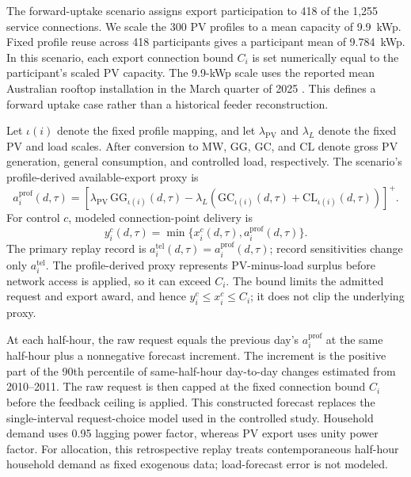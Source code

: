 \documentclass[twoside,twocolumn,9pt]{article}
\begin{document}
{The forward-uptake scenario assigns export participation to 418 of the 1,255
service connections. We scale the 300 PV profiles to a mean capacity of
9.9~kWp. Fixed profile reuse across 418 participants gives a participant mean
of 9.784~kWp. In this scenario, each export connection bound $C_i$ is set
numerically equal to the participant's scaled PV capacity.
The 9.9-kWp scale uses the reported mean Australian rooftop installation in the
March quarter of 2025 \cite{cer2025qcmrMarch}. This defines a forward uptake
case rather than a historical feeder reconstruction.

Let $\iota(i)$ denote the fixed profile mapping, and let
$\lambda_{\mathrm{PV}}$ and $\lambda_L$ denote the fixed PV and load scales.
After conversion to MW, $\mathrm{GG}$, $\mathrm{GC}$, and $\mathrm{CL}$ denote
gross PV generation, general consumption, and controlled load, respectively.
The scenario's profile-derived available-export proxy is
\begin{equation}
a_i^{\mathrm{prof}}(d,\tau)=\left[\lambda_{\mathrm{PV}}\,\mathrm{GG}_{\iota(i)}(d,\tau)
-\lambda_L\!\left(\mathrm{GC}_{\iota(i)}(d,\tau)+
\mathrm{CL}_{\iota(i)}(d,\tau)\right)\right]^+.
\label{eq:au_available_export_main}
\end{equation}
For control $c$, modeled connection-point delivery is
\begin{equation}
y_i^c(d,\tau)=\min\{x_i^c(d,\tau),a_i^{\mathrm{prof}}(d,\tau)\}.
\label{eq:au_delivery_main}
\end{equation}
The primary replay record is
$a_i^{\mathrm{tel}}(d,\tau)=a_i^{\mathrm{prof}}(d,\tau)$; record sensitivities
change only $a_i^{\mathrm{tel}}$. The profile-derived proxy represents
PV-minus-load surplus before network access is applied, so it can exceed $C_i$.
The bound limits the admitted request and export award, and hence
$y_i^c\le x_i^c\le C_i$; it does not clip the underlying proxy.

At each half-hour, the raw request equals the previous day's
$a_i^{\mathrm{prof}}$ at the same half-hour plus a nonnegative forecast increment.
The increment is the positive part of the 90th percentile of same-half-hour
day-to-day changes estimated from 2010--2011. The raw request is then capped
at the fixed connection bound $C_i$ before the feedback ceiling is applied.
This constructed forecast replaces the single-interval
request-choice model used in the controlled study. Household demand uses 0.95
lagging power factor, whereas PV export uses unity power factor.
For allocation, this retrospective replay treats contemporaneous half-hour
household demand as fixed exogenous data; load-forecast error is not modeled.

}
\end{document}
